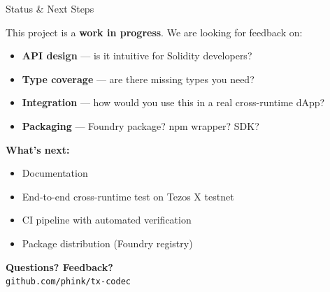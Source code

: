 \documentclass[aspectratio=169,10pt]{beamer}
\begin{document}
\begin{frame}{Status \& Next Steps}

This project is a \textbf{work in progress}. We are looking for feedback on:

\bigskip

\begin{itemize}
  \item \textbf{API design} --- is it intuitive for Solidity developers?
  \item \textbf{Type coverage} --- are there missing types you need?
  \item \textbf{Integration} --- how would you use this in a real cross-runtime dApp?
  \item \textbf{Packaging} --- Foundry package? npm wrapper? SDK?
\end{itemize}

\bigskip

\textbf{What's next:}
\begin{itemize}
  \item Documentation
  \item End-to-end cross-runtime test on Tezos X testnet
  \item CI pipeline with automated verification
  \item Package distribution (Foundry registry)
\end{itemize}

\bigskip
\centering
\large\textbf{Questions? Feedback?}\\[0.3em]
\normalsize\texttt{github.com/phink/tx-codec}
\end{frame}
\end{document}
